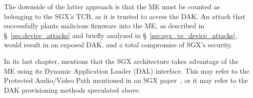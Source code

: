 The downside of the latter approach is that the ME must be counted as belonging
to the SGX's TCB, as it is trusted to access the DAK. An attack that
successfully plants malicious firmware into the ME, as described in
\S~\ref{sec:device_attacks} and briefly analyzed in
\S~\ref{sec:sgx_vs_device_attacks}, would result in an exposed DAK, and a total
compromise of SGX's security.


In its last chapter, \cite{ruan2014intelme} mentions that the SGX architecture
takes advantage of the ME using its Dynamic Application Loader (DAL) interface.
This may refer to the Protected Audio/Video Path mentioned in an SGX
paper~\cite{hoekstra2013sgx}, or it may refer to the DAK provisioning methods
speculated above.
